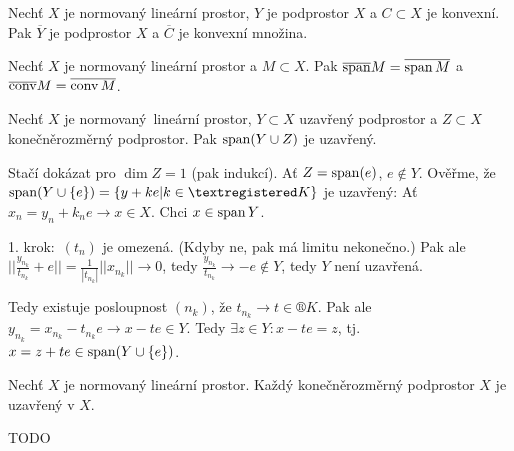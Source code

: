 \documentclass[12pt]{article}					%
\begin{document}
\begin{poznamka}[Fakt]
	Nechť $X$ je normovaný lineární prostor, $Y$ je podprostor $X$ a $C \subset X$ je konvexní. Pak $\overline{Y}$ je podprostor $X$ a $\overline{C}$ je konvexní množina.
\end{poznamka}

\begin{poznamka}[Fakt]
	Nechť $X$ je normovaný lineární prostor a $M \subset X$. Pak $\overline{\operatorname{span}} M = \overline{\operatorname{span} M}$ a $\overline{\operatorname{conv}} M = \overline{\operatorname{conv} M}$.
\end{poznamka}

\begin{veta}
	Nechť $X$ je normovaný lineární prostor, $Y \subset X$ uzavřený podprostor a $Z \subset X$ konečněrozměrný podprostor. Pak $\operatorname{span}(Y \cup Z)$ je uzavřený.

	\begin{dukazin}
		Stačí dokázat pro $\dim Z = 1$ (pak indukcí). Ať $Z = \operatorname{span}(e)$, $e \notin Y$. Ověřme, že $\spn(Y \cup \{e\}) = \{y + ke | k \in ®K\}$ je uzavřený: Ať $x_n = y_n + k_n e \rightarrow x \in X$. Chci $x \in \operatorname{span} Y$.

		1. krok: $(t_n)$ je omezená. (Kdyby ne, pak má limitu nekonečno.) Pak ale $||\frac{y_{n_k}}{t_{n_k}} + e || = \frac{1}{|t_{n_k}|} ||x_{n_k}|| \rightarrow 0$, tedy $\frac{y_{n_k}}{t_{n_k}} \rightarrow -e \notin Y$, tedy $Y$ není uzavřená. \lightning

		Tedy existuje posloupnost $(n_k)$, že $t_{n_k} \rightarrow t \in ®K$. Pak ale $y_{n_k} = x_{n_k} - t_{n_k}e \rightarrow x - t e \in Y$. Tedy $\exists z \in Y: x - t e = z$, tj. $x = z + t e \in \operatorname{span}(Y \cup \{e\})$.
	\end{dukazin}
\end{veta}

\begin{dusledek}
	Nechť $X$ je normovaný lineární prostor. Každý konečněrozměrný podprostor $X$ je uzavřený v $X$.
\end{dusledek}


TODO
\end{document}
